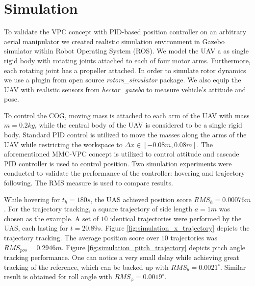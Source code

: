 \section{Simulation}
\label{sec:simulation}
To validate the VPC concept with PID-based position controller on an arbitrary aerial manipulator we created realistic simulation environment in Gazebo simulator within Robot Operating System (ROS). We model the UAV a as single rigid body with rotating joints attached to each of four motor arms. Furthermore, each rotating joint has a propeller attached. In order to simulate rotor dynamics we use a plugin from open source \textit{rotors\_simulator} \cite{Furrer2016} package. We also equip the UAV with realistic sensors from \textit{hector\_gazebo} \cite{2012simpar_meyer} to measure vehicle's attitude and pose.

To control the COG, moving mass is attached to each arm of the UAV with mass $m=0.2kg$, while the central body of the UAV is considered to be a single rigid body. Standard PID control is utilized to move the masses along the arms of the UAV while restricting the workspace to $\Delta x \in [-0.08m, 0.08m]$. The aforementioned MMC-VPC concept is utilized to control attitude and cascade PID controller is used to control position. Two simulation experiments were conducted to validate the performance of the controller: hovering and trajectory following. The RMS measure is used to compare results.

While hovering for $t_h = 180s$, the UAS achieved position score $RMS_h = 0.00076m$. For the trajectory tracking, a square trajectory of side length $a=1m$ was chosen as the example. A set of $10$ identical trajectories were performed by the UAS, each lasting for $t=20.89s$. Figure \ref{fig:simulation_x_trajectory} depicts the trajectory tracking. The average position score over $10$ trajectories was $RMS_{pos} = 0.2946m$. Figure \ref{fig:simulation_pitch_trajectory} depicts pitch angle tracking performance. One can notice a very small delay while achieving great tracking of the reference, which can be backed up with $RMS_{\theta} = 0.0021^\circ$. Similar result is obtained for roll angle with $RMS_{\phi} = 0.0019^\circ$.  
